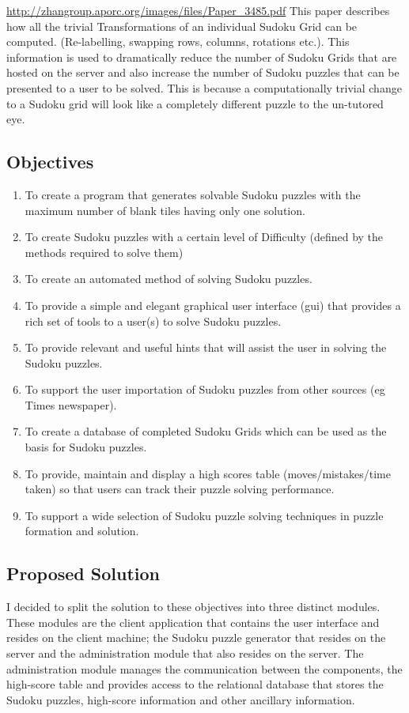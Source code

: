 \documentclass[fleqn]{article}
\begin{document}
\url{http://zhangroup.aporc.org/images/files/Paper_3485.pdf}
This paper describes how all the trivial Transformations of an individual Sudoku Grid can be computed. (Re-labelling, swapping rows, columns, rotations etc.). This information is used to dramatically reduce the number of Sudoku Grids that are hosted on the server and also increase the number of Sudoku puzzles that can be presented to a user to be solved. This is because a computationally trivial change to a Sudoku grid will look like a completely different puzzle to the un-tutored eye.

\subsection{Objectives}
\begin{enumerate}
\item To create a program that generates solvable Sudoku puzzles with the maximum number of blank tiles having only one solution.
\item To create Sudoku puzzles with a certain level of Difficulty (defined by the methods required to solve them)
\item To create an automated method of solving Sudoku puzzles.
\item To provide a simple and elegant graphical user interface (gui) that provides a rich set of tools to a user(s) to solve Sudoku puzzles.
\item To provide relevant and useful hints that will assist the user in solving the Sudoku puzzles.
\item To support the user importation of Sudoku puzzles from other sources (eg Times newspaper).
\item To create a database of completed Sudoku Grids which can be used as the basis for Sudoku puzzles.
\item To provide, maintain and display a high scores table (moves/mistakes/time taken) so that users can track their puzzle solving performance.
\item To support a wide selection of Sudoku puzzle solving techniques in puzzle formation and solution.
\end{enumerate}


\subsection{Proposed Solution}
I decided to split the solution to these objectives into three distinct modules. These modules are the client application that contains the user interface and resides on the client machine; the Sudoku puzzle generator that resides on the server and the administration module that also resides on the server. The administration module manages the communication between the components, the high-score table and provides access to the relational database that stores the Sudoku puzzles, high-score information and other ancillary information.
\end{document}
